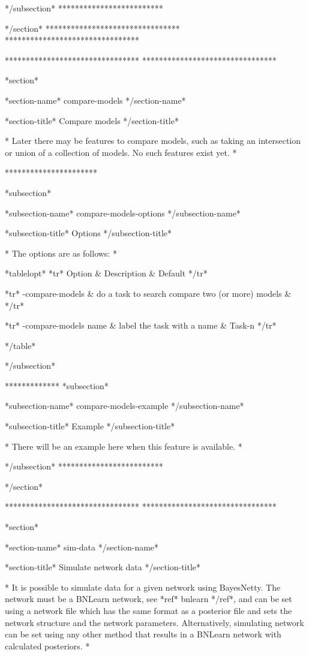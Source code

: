 */subsection* *************************


*/section* ******************************** ********************************


******************************** ********************************

*section*

*section-name* compare-models */section-name*

*section-title* Compare models */section-title*

* Later there may be features to compare models, such as taking an intersection or union of a collection of models. No such features exist yet. *

**********************

*subsection*

*subsection-name* compare-models-options */subsection-name*

*subsection-title* Options */subsection-title*

* The options are as follows: *

*tablelopt* *tr* Option & Description & Default */tr*

*tr*
 -compare-models  & do a task to search compare two (or more) models &
*/tr*

*tr*
  -compare-models name & label the task with a name & Task-n
*/tr*

*/table*

*/subsection*

************* *subsection*

*subsection-name* compare-models-example */subsection-name*

*subsection-title* Example */subsection-title*

* There will be an example here when this feature is available. *


*/subsection* *************************

*/section*

******************************** ********************************

*section*

*section-name* sim-data */section-name*

*section-title* Simulate network data */section-title*

* It is possible to simulate data for a given network using BayesNetty. The network must be a BNLearn network, see *ref* bnlearn */ref*, and can be set using a network file which has the same format as a posterior file and sets the network structure and the network parameters. Alternatively, simulating network can be set using any other method that results in a BNLearn network with calculated posteriors. *

